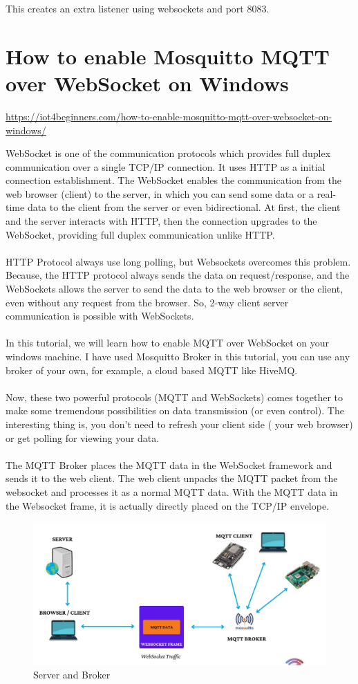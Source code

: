 \documentclass[oneside]{book}
\begin{document}
This creates an extra listener using websockets and port 8083.

\chapter{How to enable Mosquitto MQTT over WebSocket on Windows}
\url{https://iot4beginners.com/how-to-enable-mosquitto-mqtt-over-websocket-on-windows/}


WebSocket is one of the communication protocols which provides full duplex communication over a single TCP/IP connection. It uses HTTP as a initial connection establishment. The WebSocket enables the communication from the web browser (client) to the server, in which you can send some data or a real-time data to the client from the server or even bidirectional. At first, the client and the server interacts with HTTP, then the connection upgrades to the WebSocket, providing full duplex communication unlike HTTP. 
\\\\
HTTP Protocol always use long polling, but Websockets overcomes this problem. Because, the HTTP protocol always sends the data on request/response, and the WebSockets allows the server to send the data to the web browser or the client, even without any request from the browser. So, 2-way client server communication is possible with WebSockets.
\\\\
In this tutorial, we will learn how to enable MQTT over WebSocket on your windows machine. I have used Mosquitto Broker in this tutorial, you can use any broker of your own, for example, a cloud based MQTT like HiveMQ. 
\\\\
Now, these two powerful protocols (MQTT and WebSockets) comes together to make some tremendous possibilities on data transmission (or even control). The interesting thing is, you don’t need to refresh your client side ( your web browser) or get polling for viewing your data.
\\\\
The MQTT Broker places the MQTT data in the WebSocket framework and sends it to the web client. The web client unpacks the MQTT packet from the websocket and processes it as a normal MQTT data. With the MQTT data in the Websocket frame, it is actually directly placed on the TCP/IP envelope. 
\begin{figure}[H]
\centering
\includegraphics[scale=.6]{images/broker_server.jpg}
\caption{Server and Broker}
\end{figure}
\end{document}
